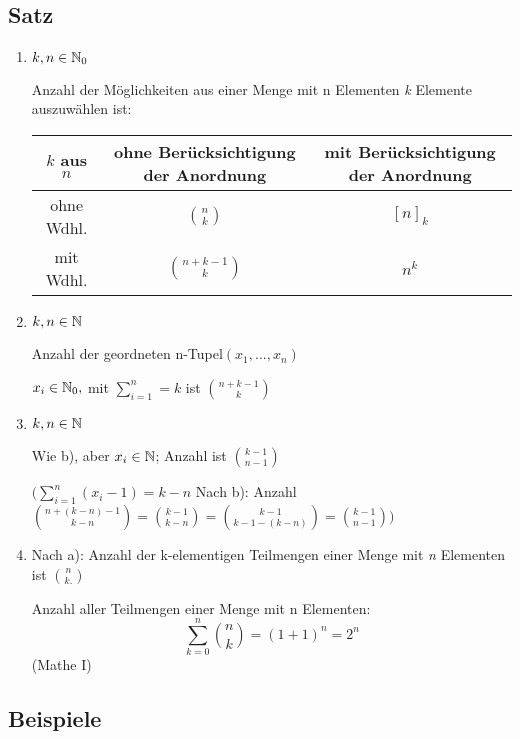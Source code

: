 \subsection{Satz}
\begin{enumerate}
\item $k,n \in \operatorname{\mathbb{N}}_0$

Anzahl der Möglichkeiten aus einer Menge mit n Elementen \textit{k} Elemente auszuwählen ist:


\begin{tabular}{c|c|c}
	$k$ aus $n$ & ohne Berücksichtigung der Anordnung & mit Berücksichtigung der Anordnung\\ \hline
	ohne Wdhl. & $\binom{n}{k}$ & $[n]_k$\\ \hline
	mit Wdhl. & $\binom{n+k-1}{k} $& $n^k$
\end{tabular}


\item $k,n \in \operatorname{\mathbb{N}}$

Anzahl der geordneten n-Tupel$(x_1,...,x_n)$

$x_i\in \operatorname{\mathbb{N}}_0,$ mit $\sum_{i=1}^{n} = k$ ist $\binom{n+k-1}{k}$

\item $k,n \in \operatorname{\mathbb{N}}$

Wie b), aber $x_i \in \operatorname{\mathbb{N}}$; Anzahl ist $\binom{k-1}{n-1}$

$ \Biggl( \sum_{i=1}^{n}(x_i-1)=k-n$ \quad Nach b): Anzahl $\binom{n+(k-n)-1}{k-n} = \binom{k-1}{k-n}=\binom{k-1}{k-1-(k-n)} = \binom{k-1}{n-1} \Biggr) $ 
\item Nach a): Anzahl der k-elementigen Teilmengen einer Menge mit \textit{n} Elementen ist $\binom{n}{k.}$

Anzahl aller Teilmengen einer Menge mit n Elementen:
$$ \sum_{k=0}^{n}\binom{n}{k}= (1+1)^n = 2^n$$ (Mathe I)
\end{enumerate}

\subsection{Beispiele}


